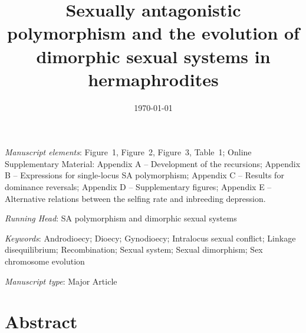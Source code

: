 \documentclass{article}
\title{Sexually antagonistic polymorphism and the evolution of dimorphic sexual systems in hermaphrodites}
\date{\today}
\begin{document}
\maketitle





\bigskip

\noindent{} \textit{Manuscript elements}: Figure~1, Figure~2, Figure~3, Table~1; Online Supplementary Material: Appendix A -- Development of the recursions; Appendix B -- Expressions for single-locus SA polymorphism; Appendix C -- Results for dominance reversals; Appendix D -- Supplementary figures; Appendix E -- Alternative relations between the selfing rate and inbreeding depression.

\bigskip
\noindent{} \textit{Running Head}: SA polymorphism and dimorphic sexual systems

\bigskip

\noindent{} \textit{Keywords}: Androdioecy; Dioecy; Gynodioecy; Intralocus sexual conflict; Linkage disequilibrium; Recombination; Sexual system; Sexual dimorphism; Sex chromosome evolution

\bigskip

\noindent{} \textit{Manuscript type}: Major Article

\bigskip


\linenumbers
\modulolinenumbers[1]
\renewcommand\linenumberfont{\normalfont\small}


\newpage{}
\section*{Abstract}
\end{document}
